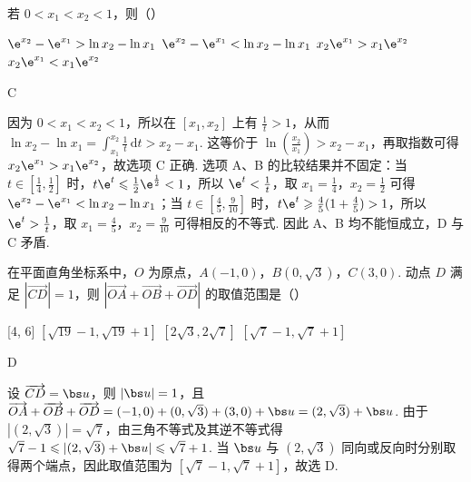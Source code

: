\begin{problem}
若 \(0 < x_{1} < x_{2} < 1\)，则（\quad）

\choices
    {\(\e^{x_2} - \e^{x_1} > \ln x_2 - \ln x_1\)}
    {\(\e^{x_2} - \e^{x_1} < \ln x_2 - \ln x_1\)}
    {\(x_{2}\e^{x_{1}} > x_{1}\e^{x_{2}}\)}
    {\(x_{2}\e^{x_{1}} < x_{1}\e^{x_{2}}\)}
\end{problem}

\begin{answer}
C
\end{answer}

\begin{solution}
因为 \(0<x_1<x_2<1\)，所以在 \([x_1,x_2]\) 上有 \(\frac{1}{t}>1\)，从而 \(\ln x_2-\ln x_1=\displaystyle\int_{x_1}^{x_2}\frac{1}{t}\,\mathrm dt>x_2-x_1\). 这等价于 \(\ln(\frac{x_2}{x_1})>x_2-x_1\)，再取指数可得 \(x_2\e^{x_1}>x_1\e^{x_2}\)，故选项 C 正确. 选项 A、B 的比较结果并不固定：当 \(t\in[\frac{1}{4},\frac{1}{2}]\) 时，\(t\e^t\leqslant \frac12\e^{\frac{1}{2}}<1\)，所以 \(\e^t<\frac{1}{t}\)，取 \(x_1=\frac{1}{4}\)，\(x_2=\frac{1}{2}\) 可得 \(\e^{x_2}-\e^{x_1}<\ln x_2-\ln x_1\)；当 \(t\in[\frac{4}{5},\frac{9}{10}]\) 时，\(t\e^t\geqslant\frac45(1+\frac45)>1\)，所以 \(\e^t>\frac{1}{t}\)，取 \(x_1=\frac{4}{5}\)，\(x_2=\frac{9}{10}\) 可得相反的不等式. 因此 A、B 均不能恒成立，D 与 C 矛盾.
\end{solution}

\begin{problem}
在平面直角坐标系中，\(O\) 为原点，\(A(-1,0)\)，\(B(0,\sqrt{3})\)，\(C(3,0)\). 动点 \(D\) 满足 \(\left|\overrightarrow{CD}\right| = 1\)，则 \(\left|\overrightarrow{OA} + \overrightarrow{OB} + \overrightarrow{OD}\right|\) 的取值范围是（\quad）

\choices
    {[4, 6]}
    {\([\sqrt{19} - 1, \sqrt{19} + 1]\)}
    {\([2\sqrt{3}, 2\sqrt{7}]\)}
    {\([\sqrt{7} - 1, \sqrt{7} + 1]\)}
\end{problem}

\begin{answer}
D
\end{answer}

\begin{solution}
设 \(\overrightarrow{CD}=\bs u\)，则 \(|\bs u|=1\)，且 \(\overrightarrow{OA}+\overrightarrow{OB}+\overrightarrow{OD}=(-1,0)+(0,\sqrt3)+(3,0)+\bs u=(2,\sqrt3)+\bs u\). 由于 \(|(2,\sqrt3)|=\sqrt7\)，由三角不等式及其逆不等式得 \(\sqrt7-1\leqslant|(2,\sqrt3)+\bs u|\leqslant\sqrt7+1\). 当 \(\bs u\) 与 \((2,\sqrt3)\) 同向或反向时分别取得两个端点，因此取值范围为 \([\sqrt7-1,\sqrt7+1]\)，故选 D.
\end{solution}

